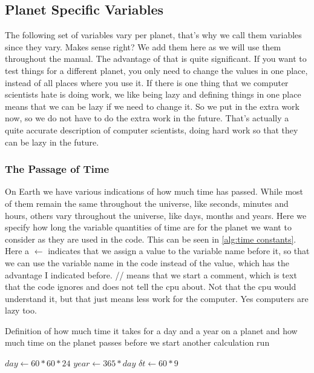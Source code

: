 \subsection{Planet Specific Variables}
The following set of variables vary per planet, that's why we call them variables since they vary. Makes sense right? We add them here as we will use them throughout the manual. The advantage
of that is quite significant. If you want to test things for a different planet, you only need to change the values in one place, instead of all places where you use it. If there is one thing 
that we computer scientists hate is doing work, we like being lazy and defining things in one place means that we can be lazy if we need to change it. So we put in the extra work now, so we do 
not have to do the extra work in the future. That's actually a quite accurate description of computer scientists, doing hard work so that they can be lazy in the future.

\subsubsection{The Passage of Time}
On Earth we have various indications of how much time has passed. While most of them remain the same throughout the universe, like seconds, minutes and hours, others vary throughout the universe,
like days, months and years. Here we specify how long the variable quantities of time are for the planet we want to consider as they are used in the code. This can be seen in 
\autoref{alg:time constants}. Here a $\leftarrow$ indicates that we assign a value to the variable name before it, so that we can use the variable name in the code instead of the value, which 
has the advantage I indicated before. // means that we start a comment, which is text that the code ignores and does not tell the cpu about. Not that the cpu would understand it, but that just 
means less work for the computer. Yes computers are lazy too.

\begin{algorithm*}
    \caption{Definition of how much time it takes for a day and a year on a planet and how much time on the planet passes before we start another calculation run}
    \label{alg:time constants}
    $day \leftarrow 60*60*24$ 
    $year \leftarrow 365*day$ 
    $\delta t \leftarrow 60 * 9$ 
\end{algorithm*}

